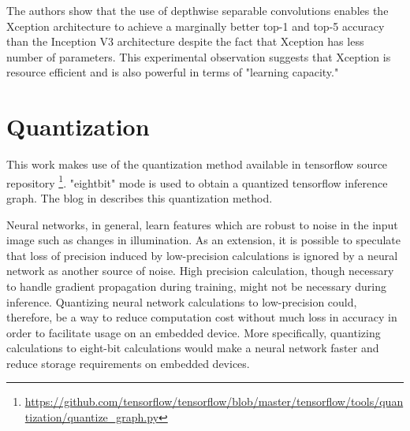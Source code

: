 The authors show that the use of depthwise separable convolutions enables the Xception architecture to achieve a marginally better top-1 and top-5 accuracy than the Inception V3 architecture despite the fact that Xception has less number of parameters. This experimental observation suggests that Xception is resource efficient and is also powerful in terms of "learning capacity."





\section{Quantization}

This work makes use of the quantization method available in tensorflow source repository \footnote{\url{https://github.com/tensorflow/tensorflow/blob/master/tensorflow/tools/quantization/quantize_graph.py}}. "eightbit" mode is used to obtain a quantized tensorflow inference graph. The blog in \cite{quant_blog} describes this quantization method.

Neural networks, in general, learn features which are robust to noise in the input image such as changes in illumination. As an extension, it is possible to speculate that loss of precision induced by low-precision calculations is ignored by a neural network as another source of noise. High precision calculation, though necessary to handle gradient propagation during training, might not be necessary during inference. Quantizing neural network calculations to low-precision could, therefore, be a way to reduce computation cost without much loss in accuracy in order to facilitate usage on an embedded device. More specifically, quantizing calculations to eight-bit calculations would make a neural network faster and reduce storage requirements on embedded devices. 

